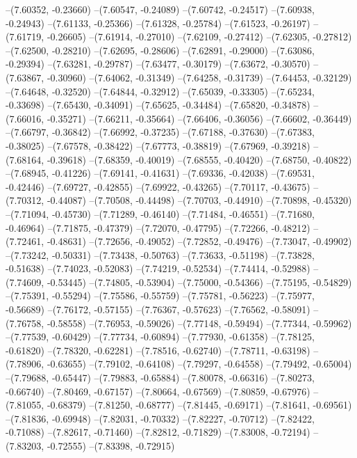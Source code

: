 --(7.60352, -0.23660)
--(7.60547, -0.24089)
--(7.60742, -0.24517)
--(7.60938, -0.24943)
--(7.61133, -0.25366)
--(7.61328, -0.25784)
--(7.61523, -0.26197)
--(7.61719, -0.26605)
--(7.61914, -0.27010)
--(7.62109, -0.27412)
--(7.62305, -0.27812)
--(7.62500, -0.28210)
--(7.62695, -0.28606)
--(7.62891, -0.29000)
--(7.63086, -0.29394)
--(7.63281, -0.29787)
--(7.63477, -0.30179)
--(7.63672, -0.30570)
--(7.63867, -0.30960)
--(7.64062, -0.31349)
--(7.64258, -0.31739)
--(7.64453, -0.32129)
--(7.64648, -0.32520)
--(7.64844, -0.32912)
--(7.65039, -0.33305)
--(7.65234, -0.33698)
--(7.65430, -0.34091)
--(7.65625, -0.34484)
--(7.65820, -0.34878)
--(7.66016, -0.35271)
--(7.66211, -0.35664)
--(7.66406, -0.36056)
--(7.66602, -0.36449)
--(7.66797, -0.36842)
--(7.66992, -0.37235)
--(7.67188, -0.37630)
--(7.67383, -0.38025)
--(7.67578, -0.38422)
--(7.67773, -0.38819)
--(7.67969, -0.39218)
--(7.68164, -0.39618)
--(7.68359, -0.40019)
--(7.68555, -0.40420)
--(7.68750, -0.40822)
--(7.68945, -0.41226)
--(7.69141, -0.41631)
--(7.69336, -0.42038)
--(7.69531, -0.42446)
--(7.69727, -0.42855)
--(7.69922, -0.43265)
--(7.70117, -0.43675)
--(7.70312, -0.44087)
--(7.70508, -0.44498)
--(7.70703, -0.44910)
--(7.70898, -0.45320)
--(7.71094, -0.45730)
--(7.71289, -0.46140)
--(7.71484, -0.46551)
--(7.71680, -0.46964)
--(7.71875, -0.47379)
--(7.72070, -0.47795)
--(7.72266, -0.48212)
--(7.72461, -0.48631)
--(7.72656, -0.49052)
--(7.72852, -0.49476)
--(7.73047, -0.49902)
--(7.73242, -0.50331)
--(7.73438, -0.50763)
--(7.73633, -0.51198)
--(7.73828, -0.51638)
--(7.74023, -0.52083)
--(7.74219, -0.52534)
--(7.74414, -0.52988)
--(7.74609, -0.53445)
--(7.74805, -0.53904)
--(7.75000, -0.54366)
--(7.75195, -0.54829)
--(7.75391, -0.55294)
--(7.75586, -0.55759)
--(7.75781, -0.56223)
--(7.75977, -0.56689)
--(7.76172, -0.57155)
--(7.76367, -0.57623)
--(7.76562, -0.58091)
--(7.76758, -0.58558)
--(7.76953, -0.59026)
--(7.77148, -0.59494)
--(7.77344, -0.59962)
--(7.77539, -0.60429)
--(7.77734, -0.60894)
--(7.77930, -0.61358)
--(7.78125, -0.61820)
--(7.78320, -0.62281)
--(7.78516, -0.62740)
--(7.78711, -0.63198)
--(7.78906, -0.63655)
--(7.79102, -0.64108)
--(7.79297, -0.64558)
--(7.79492, -0.65004)
--(7.79688, -0.65447)
--(7.79883, -0.65884)
--(7.80078, -0.66316)
--(7.80273, -0.66740)
--(7.80469, -0.67157)
--(7.80664, -0.67569)
--(7.80859, -0.67976)
--(7.81055, -0.68379)
--(7.81250, -0.68777)
--(7.81445, -0.69171)
--(7.81641, -0.69561)
--(7.81836, -0.69948)
--(7.82031, -0.70332)
--(7.82227, -0.70712)
--(7.82422, -0.71088)
--(7.82617, -0.71460)
--(7.82812, -0.71829)
--(7.83008, -0.72194)
--(7.83203, -0.72555)
--(7.83398, -0.72915)
